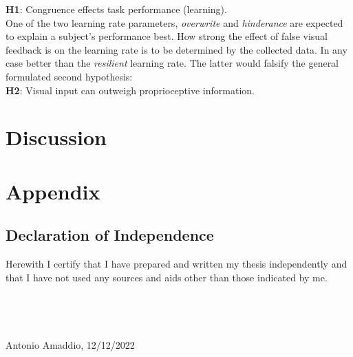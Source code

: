 \documentclass[man]{apa7}
\begin{document}
\textbf{H1}: Congruence effects task performance (learning).\\

One of the two learning rate parameters, \textit{overwrite} and \textit{hinderance} are expected to explain a subject's performance best. How strong the effect of false visual feedback is on the learning rate is to be determined by the collected data. In any case better than the \textit{resilient} learning rate. The latter would falsify the general formulated second hypothesis: \\

\textbf{H2}: Visual input can outweigh proprioceptive information.

\section{Discussion}

\printbibliography
\newpage
\section{Appendix}

\subsection{Declaration of Independence}

Herewith I certify that I have prepared and written my thesis independently and that I have not used any sources and aids other than those indicated by me. \\
\mbox{}\\
\mbox{}\\
\mbox{}\\
\mbox{}\\
Antonio Amaddio, 12/12/2022
\end{document}
